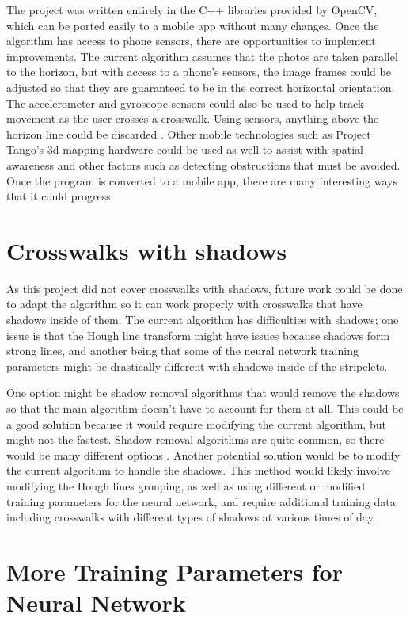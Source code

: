 \documentclass[12pt]{ucthesis}
\begin{document}
The project was written entirely in the C++ libraries provided by OpenCV, which can be ported easily to a mobile app without many changes. Once the algorithm has access to phone sensors, there are opportunities to implement improvements. The current algorithm assumes that the photos are taken parallel to the horizon, but with access to a phone's sensors, the image frames could be adjusted so that they are guaranteed to be in the correct horizontal orientation. The accelerometer and gyroscope sensors could also be used to help track movement as the user crosses a crosswalk. Using sensors, anything above the horizon line could be discarded \cite{Crosswatch2Lane}. Other mobile technologies such as Project Tango's 3d mapping hardware \cite{projectTango} could be used as well to assist with spatial awareness and other factors such as detecting obstructions that must be avoided. Once the program is converted to a mobile app, there are many interesting ways that it could progress.

\section{Crosswalks with shadows}

As this project did not cover crosswalks with shadows, future work could be done to adapt the algorithm so it can work properly with crosswalks that have shadows inside of them. The current algorithm has difficulties with shadows; one issue is that the Hough line transform might have issues because shadows form strong lines, and another being that some of the neural network training parameters might be drastically different with shadows inside of the stripelets. 

One option might be shadow removal algorithms that would remove the shadows so that the main algorithm doesn't have to account for them at all. This could be a good solution because it would require modifying the current algorithm, but might not the fastest. Shadow removal algorithms are quite common, so there would be many different options \cite{shadowRemoval}. Another potential solution would be to modify the current algorithm to handle the shadows. This method would likely involve modifying the Hough lines grouping, as well as using different or modified training parameters for the neural network, and require additional training data including crosswalks with different types of shadows at various times of day. 

\section{More Training Parameters for Neural Network}
\end{document}
